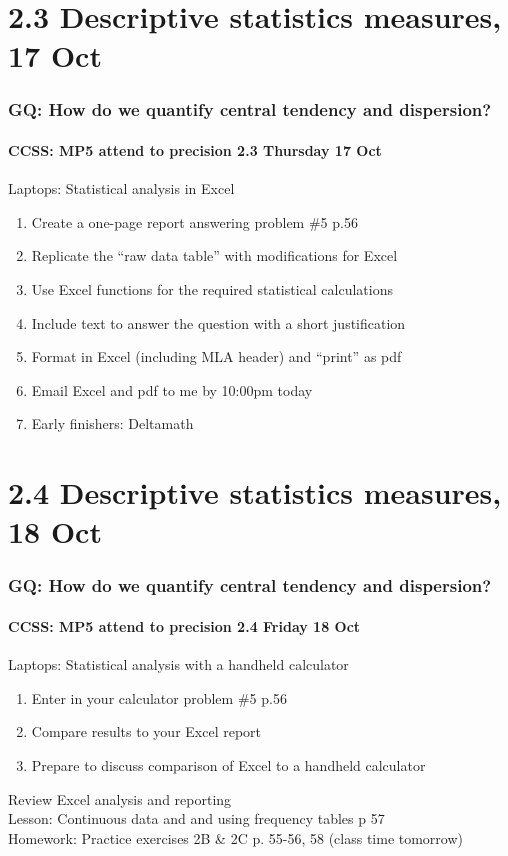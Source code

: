 \documentclass{beamer}
\begin{document}
  \section{2.3 Descriptive statistics measures, 17 Oct}
  \frame
  {
    \frametitle{GQ: How do we quantify central tendency and dispersion?}
    \framesubtitle{CCSS: MP5 attend to precision \hfill \alert{2.3 Thursday 17 Oct}}

    \begin{block}{Laptops: Statistical analysis in Excel}
    \begin{enumerate}
        \item Create a one-page report answering problem \#5 p.56
        \item Replicate the ``raw data table'' with modifications for Excel
        \item Use Excel functions for the required statistical calculations
        \item Include text to answer the question with a short justification
        \item Format in Excel (including MLA header) and ``print'' as pdf
        \item Email Excel and pdf to me by 10:00pm today
        \item Early finishers: Deltamath
    \end{enumerate}
    \end{block}
  }

  \section{2.4 Descriptive statistics measures, 18 Oct}
  \frame
  {
    \frametitle{GQ: How do we quantify central tendency and dispersion?}
    \framesubtitle{CCSS: MP5 attend to precision \hfill \alert{2.4 Friday 18 Oct}}

    \begin{block}{Laptops: Statistical analysis with a handheld calculator}
    \begin{enumerate}
        \item Enter in your calculator problem \#5 p.56
        \item Compare results to your Excel report
        \item Prepare to discuss comparison of Excel to a handheld calculator
    \end{enumerate}
    \end{block}
    Review Excel analysis and reporting \\
    Lesson: Continuous data and and using frequency tables p 57\\ \smallskip
    Homework: Practice exercises 2B \& 2C p. 55-56, 58 (class time tomorrow)
  }
\end{document}
